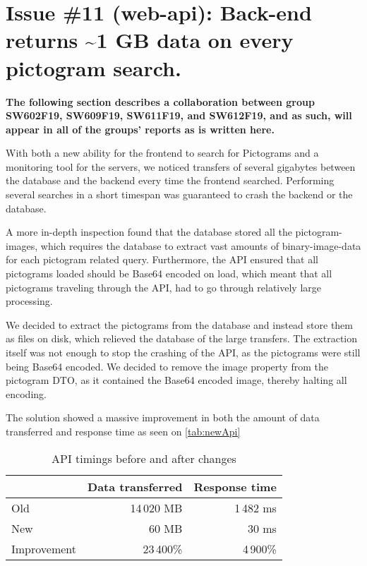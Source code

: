 \section{Issue \#11 (web-api): Back-end returns \textasciitilde 1 GB data on every pictogram search.}
\label{sect:backendImprovement}
\textbf{The following section describes a collaboration between group SW602F19, SW609F19, SW611F19, and SW612F19, and as such, will appear in all of the groups' reports as is written here.}

With both a new ability for the frontend to search for Pictograms and a monitoring tool for the servers, we noticed transfers of several gigabytes between the database and the backend every time the frontend searched. Performing several searches in a short timespan was guaranteed to crash the backend or the database.

A more in-depth inspection found that the database stored all the pictogram-images, which requires the database to extract vast amounts of binary-image-data for each pictogram related query. Furthermore, the API ensured that all pictograms loaded should be Base64 encoded on load, which meant that all pictograms traveling through the API, had to go through relatively large processing.

We decided to extract the pictograms from the database and instead store them as files on disk, which relieved the database of the large transfers. The extraction itself was not enough to stop the crashing of the API, as the pictograms were still being Base64 encoded. We decided to remove the image property from the pictogram DTO, as it contained the Base64 encoded image, thereby halting all encoding.

The solution showed a massive improvement in both the amount of data transferred and response time as seen on \autoref{tab:newApi}

\begin{table}[H]
    \centering
    \begin{tabular}{|l|r|r|}
    \hline
                    & Data transferred      & Response time     \\ \hline
        Old         & 14\,020 MB            & 1\,482 ms         \\ \hline 
        New         & 60 MB                 & 30 ms             \\ \hline
        Improvement & 23\,400\%             & 4\,900\%          \\ \hline
    \end{tabular}
    \caption{API timings before and after changes}
    \label{tab:newApi}
\end{table}

